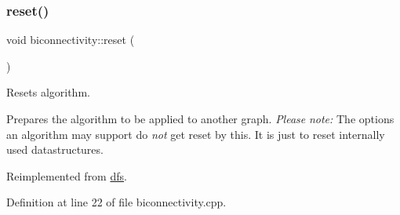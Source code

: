 \subsubsection{\texorpdfstring{reset()}{reset()}}
{\footnotesize\ttfamily void biconnectivity\+::reset (\begin{DoxyParamCaption}{ }\end{DoxyParamCaption})\hspace{0.3cm}{\ttfamily [virtual]}}



Resets algorithm. 

Prepares the algorithm to be applied to another graph. {\itshape Please} {\itshape note\+:} The options an algorithm may support do {\itshape not} get reset by this. It is just to reset internally used datastructures. 

Reimplemented from \mbox{\hyperlink{classdfs_affaffda8be8418d6dbf396c5b1d6b81a}{dfs}}.



Definition at line 22 of file biconnectivity.\+cpp.


